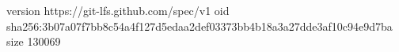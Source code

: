 version https://git-lfs.github.com/spec/v1
oid sha256:3b07a07f7bb8c54a4f127d5edaa2def03373bb4b18a3a27dde3af10c94e9d7ba
size 130069

